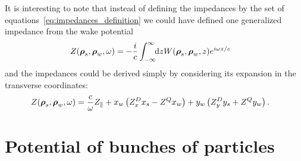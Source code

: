     It is interesting to note that instead of defining the impedances by the set of equations~\eqref{eq:impedances_definition} we could have defined one generalized impedance from the wake potential
    \begin{align}\label{eq:generalized_impedance_definition}
            Z(\boldsymbol{\rho}_s, \boldsymbol{\rho}_w, \omega) &= -\frac{i}{c} \int_{-\infty}^{\infty}\!\!\text{d}z W(\boldsymbol{\rho}_s, \boldsymbol{\rho}_w, z)e^{i\omega z/c}
    \end{align}
    and the impedances could be derived simply by considering its expansion in the transverse coordinates:
    \begin{align}
        Z(\boldsymbol{\rho}_s, \boldsymbol{\rho}_w, \omega) &=
	  		\frac{c}{\omega}Z_\parallel +
			x_w\left(Z^D_xx_s - Z^Qx_w\right) +
			y_w\left(Z^D_yy_s + Z^Qy_w\right).
    \end{align}

\section{Potential of bunches of particles}\label{sec:potential_of_bunch}

